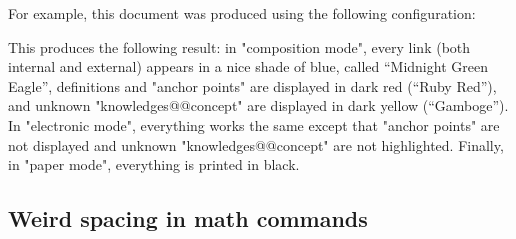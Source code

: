 \documentclass{article}
\begin{document}
For example, this document was produced using the following configuration:
\begin{spverbatim}
    
\end{spverbatim}

This produces the following result: in "composition mode",
every link (both internal and external) appears in 
a nice shade of blue, called ``Midnight Green Eagle'', definitions and "anchor 
points" are displayed in dark red (``Ruby Red''), and unknown 
"knowledges@@concept" are displayed in dark yellow (``Gamboge'').
In "electronic mode", everything works the same except that
"anchor points" are not displayed and unknown "knowledges@@concept" are 
not highlighted. Finally, in "paper mode", everything is printed in black.

\subsection{Weird spacing in math commands}
\end{document}
